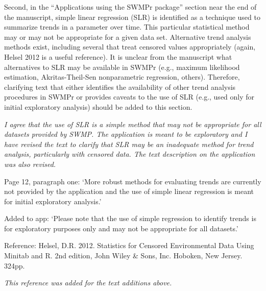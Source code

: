 \documentclass[letterpaper,12pt]{article}\usepackage[]{graphicx}\usepackage[]{color}
\begin{document}
Second, in the ``Applications using the SWMPr package'' section near the end of the manuscript, simple linear regression (SLR) is identified as a technique used to summarize trends in a parameter over time. This particular statistical method may or may not be appropriate for a given data set. Alternative trend analysis methods exist, including several that treat censored values appropriately (again, Helsel 2012 is a useful reference). It is unclear from the manuscript what alternatives to SLR may be available in SWMPr (e.g., maximum likelihood estimation, Akritas-Theil-Sen nonparametric regression, others). Therefore, clarifying text that either identifies the availability of other trend analysis procedures in SWMPr or provides caveats to the use of SLR (e.g., used only for initial exploratory analysis) should be added to this section.

{\it I agree that the use of SLR is a simple method that may not be appropriate for all datasets provided by SWMP.  The application is meant to be exploratory and I have revised the text to clarify that SLR may be an inadequate method for trend analysis, particularly with censored data.  The text description on the application was also revised.

Page 12, paragraph one: `More robust methods for evaluating trends are currently not provided by the application and the use of simple linear regression is meant for initial exploratory analysis.'

Added to app: `Please note that the use of simple regression to identify trends is for exploratory purposes only and may not be appropriate for all datasets.'
}

Reference:
Helsel, D.R. 2012. Statistics for Censored Environmental Data Using Minitab and R. 2nd edition, John Wiley \& Sons, Inc. Hoboken, New Jersey. 324pp.

{\it This reference was added for the text additions above.}
\end{document}
